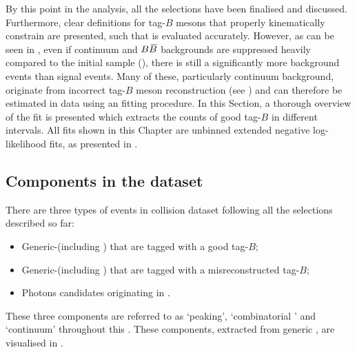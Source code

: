 By this point in the analysis, all the selections have been finalised and discussed.
Furthermore, clear definitions for tag-$B$ mesons that properly kinematically constrain \BtoXsgamma are presented, such that \EB is evaluated accurately.
However, as can be seen in , even if continuum and $B\kern 0.18em\overline{\kern -0.18em B}{}$ backgrounds are suppressed heavily compared to the initial sample (),
there is still a significantly more background events than \BtoXsgamma signal events.
Many of these, particularly continuum background, originate from incorrect tag-$B$ meson reconstruction (see ) and can therefore be estimated in data using an \Mbc fitting procedure.
In this Section, a thorough overview of the \Mbc fit is presented which extracts the counts of good tag-$B$ in different \EB intervals.
All fits shown in this Chapter are unbinned extended negative log-likelihood fits, as presented in .


\subsection{Components in the dataset}\label{sec:fitting_components}

There are three types of events in \epem collision dataset following all the selections described so far:
\begin{itemize}
    \item Generic-\BB (including \BtoXsgamma) that are tagged with a good tag-$B$;
    \item Generic-\BB (including \BtoXsgamma) that are tagged with a misreconstructed tag-$B$;
    \item Photons candidates originating in \epem\ra\qqbar.
\end{itemize}
These three components are referred to as `peaking', `combinatorial \BB' and `continuum' throughout this .
These components, extracted from generic \MC, are visualised in .

